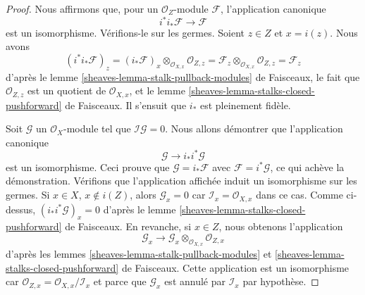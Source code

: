 \begin{proof}
Nous affirmons que, pour un $\mathcal{O}_Z$-module $\mathcal{F}$, l'application canonique
$$
i^*i_*\mathcal{F} \longrightarrow \mathcal{F}
$$
est un isomorphisme. Vérifions-le sur les germes. Soient $z \in Z$ et $x = i(z)$.
Nous avons
$$
(i^*i_*\mathcal{F})_z =
(i_*\mathcal{F})_x \otimes_{\mathcal{O}_{X, x}} \mathcal{O}_{Z, z} =
\mathcal{F}_z \otimes_{\mathcal{O}_{X, x}} \mathcal{O}_{Z, z} =
\mathcal{F}_z
$$
d'après le lemme \ref{sheaves-lemma-stalk-pullback-modules} de Faisceaux,
le fait que $\mathcal{O}_{Z, z}$ est un quotient de $\mathcal{O}_{X, x}$, et
le lemme \ref{sheaves-lemma-stalks-closed-pushforward} de Faisceaux.
Il s'ensuit que $i_*$ est pleinement fidèle.

\medskip\noindent
Soit $\mathcal{G}$ un $\mathcal{O}_X$-module tel que
$\mathcal{I}\mathcal{G} = 0$. Nous allons démontrer que l'application canonique
$$
\mathcal{G} \longrightarrow i_*i^*\mathcal{G}
$$
est un isomorphisme. Ceci prouve que $\mathcal{G} = i_*\mathcal{F}$
avec $\mathcal{F} = i^*\mathcal{G}$, ce qui achève la démonstration.
Vérifions que l'application affichée induit un isomorphisme sur les germes.
Si $x \in X$, $x \not \in i(Z)$, alors $\mathcal{G}_x = 0$
car $\mathcal{I}_x = \mathcal{O}_{X, x}$ dans ce
cas. Comme ci-dessus, $(i_*i^*\mathcal{G})_x = 0$ d'après le
lemme \ref{sheaves-lemma-stalks-closed-pushforward} de Faisceaux.
En revanche, si $x \in Z$, nous obtenons l'application
$$
\mathcal{G}_x
\longrightarrow
\mathcal{G}_x \otimes_{\mathcal{O}_{X, x}} \mathcal{O}_{Z, x}
$$
d'après les lemmes \ref{sheaves-lemma-stalk-pullback-modules} et
\ref{sheaves-lemma-stalks-closed-pushforward} de Faisceaux. Cette application est un isomorphisme
car $\mathcal{O}_{Z, x} = \mathcal{O}_{X, x}/\mathcal{I}_x$
et parce que $\mathcal{G}_x$ est annulé par $\mathcal{I}_x$ par hypothèse.
\end{proof}

